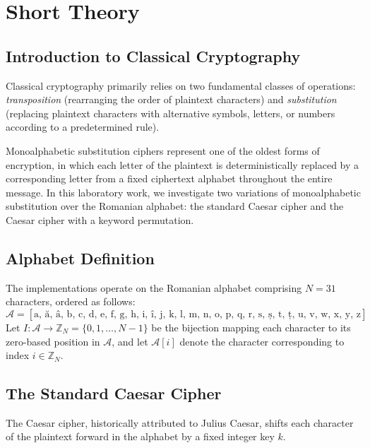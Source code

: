 \documentclass{labreport}
\begin{document}

\tableofcontents
\newpage

\section{Short Theory}

\subsection{Introduction to Classical Cryptography}
Classical cryptography primarily relies on two fundamental classes of operations: \textit{transposition} (rearranging the order of plaintext characters) and \textit{substitution} (replacing plaintext characters with alternative symbols, letters, or numbers according to a predetermined rule). 

Monoalphabetic substitution ciphers represent one of the oldest forms of encryption, in which each letter of the plaintext is deterministically replaced by a corresponding letter from a fixed ciphertext alphabet throughout the entire message. In this laboratory work, we investigate two variations of monoalphabetic substitution over the Romanian alphabet: the standard Caesar cipher and the Caesar cipher with a keyword permutation.

\subsection{Alphabet Definition}
The implementations operate on the Romanian alphabet comprising $N = 31$ characters, ordered as follows:
\begin{equation}
\mathcal{A} = [\text{a, ă, â, b, c, d, e, f, g, h, i, î, j, k, l, m, n, o, p, q, r, s, ș, t, ț, u, v, w, x, y, z}]
\end{equation}
Let $I: \mathcal{A} \to \mathbb{Z}_N = \{0, 1, \dots, N-1\}$ be the bijection mapping each character to its zero-based position in $\mathcal{A}$, and let $\mathcal{A}[i]$ denote the character corresponding to index $i \in \mathbb{Z}_N$.

\subsection{The Standard Caesar Cipher}
The Caesar cipher, historically attributed to Julius Caesar, shifts each character of the plaintext forward in the alphabet by a fixed integer key $k$.
\end{document}
